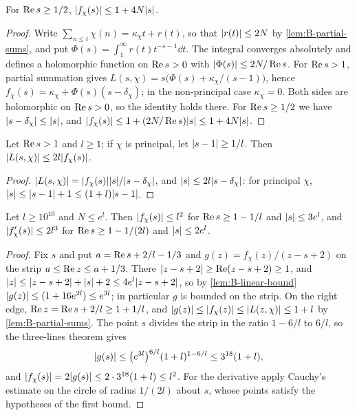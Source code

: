 \begin{lemma}\label{lem:B-linear-bound}
For $\operatorname{Re} s\ge1/2$, $\lvert f_\chi(s)\rvert\le1+4N\lvert s\rvert$.
\end{lemma}

\begin{proof}
Write $\sum_{n\le t}\chi(n)=\kappa_\chi t+r(t)$, so that $\lvert r(t)\rvert\le2N$ by \cref{lem:B-partial-sums},
and put $\Phi(s)=\int_1^\infty r(t)t^{-s-1}\dd t$. The integral converges absolutely and defines a
holomorphic function on $\operatorname{Re} s>0$ with $\lvert \Phi(s)\rvert\le2N/\operatorname{Re} s$. For $\operatorname{Re} s>1$, partial summation
gives $L(s,\chi)=s\bigl(\Phi(s)+\kappa_\chi/(s-1)\bigr)$, hence
$f_\chi(s)=\kappa_\chi+\Phi(s)(s-\delta_\chi)$; in the non-principal case $\kappa_\chi=0$. Both sides
are holomorphic on $\operatorname{Re} s>0$, so the identity holds there. For $\operatorname{Re} s\ge1/2$ we have
$\lvert s-\delta_\chi\rvert\le\lvert s\rvert$, and $\lvert f_\chi(s)\rvert\le1+(2N/\operatorname{Re} s)\lvert s\rvert\le1+4N\lvert s\rvert$.
\end{proof}

\begin{lemma}\label{lem:B-L-vs-f}
Let $\operatorname{Re} s>1$ and $l\ge1$; if $\chi$ is principal, let $\lvert s-1\rvert\ge1/l$. Then
$\lvert L(s,\chi)\rvert\le2l\lvert f_\chi(s)\rvert$.
\end{lemma}

\begin{proof}
$\lvert L(s,\chi)\rvert=\lvert f_\chi(s)\rvert\lvert s\rvert/\lvert s-\delta_\chi\rvert$, and $\lvert s\rvert\le2l\lvert s-\delta_\chi\rvert$: for
principal $\chi$, $\lvert s\rvert\le\lvert s-1\rvert+1\le(1+l)\lvert s-1\rvert$.
\end{proof}

\begin{lemma}\label{lem:B-square-bound}
Let $l\ge10^{10}$ and $N\le e^l$. Then $\lvert f_\chi(s)\rvert\le l^2$ for $\operatorname{Re} s\ge1-1/l$ and
$\lvert s\rvert\le3e^l$, and $\lvert f_\chi'(s)\rvert\le2l^3$ for $\operatorname{Re} s\ge1-1/(2l)$ and $\lvert s\rvert\le2e^l$.
\end{lemma}

\begin{proof}
Fix $s$ and put $a=\operatorname{Re} s+2/l-1/3$ and $g(z)=f_\chi(z)/(z-s+2)$ on the strip $a\le\operatorname{Re} z\le a+1/3$.
There $\lvert z-s+2\rvert\ge\operatorname{Re}(z-s+2)\ge1$, and $\lvert z\rvert\le\lvert z-s+2\rvert+\lvert s\rvert+2\le4e^l\lvert z-s+2\rvert$, so by
\cref{lem:B-linear-bound} $\lvert g(z)\rvert\le(1+16e^{2l})\le e^{3l}$; in particular $g$ is bounded on the
strip. On the right edge, $\operatorname{Re} z=\operatorname{Re} s+2/l\ge1+1/l$, and $\lvert g(z)\rvert\le\lvert f_\chi(z)\rvert\le\lvert L(z,\chi)\rvert
\le1+l$ by \cref{lem:B-partial-sums}. The point $s$ divides the strip in the ratio $1-6/l$ to $6/l$,
so the three-lines theorem gives
\[
  \lvert g(s)\rvert\le\bigl(e^{3l}\bigr)^{6/l}(1+l)^{1-6/l}\le3^{18}(1+l),
\]
and $\lvert f_\chi(s)\rvert=2\lvert g(s)\rvert\le2\cdot3^{18}(1+l)\le l^2$. For the derivative apply Cauchy's
estimate on the circle of radius $1/(2l)$ about $s$, whose points satisfy the hypotheses of the first
bound.
\end{proof}

